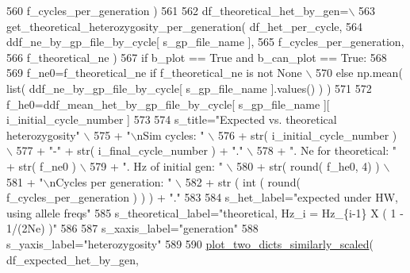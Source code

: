 \begin{DoxyCode}
560                                                                             f\_cycles\_per\_generation )
561 
562         df\_theoretical\_het\_by\_gen=\(\backslash\)
563             get\_theoretical\_heterozygosity\_per\_generation( df\_het\_per\_cycle,
564                                                             ddf\_ne\_by\_gp\_file\_by\_cycle[ s\_gp\_file\_name ],
565                                                             f\_cycles\_per\_generation,
566                                                             f\_theoretical\_ne )
567         \textcolor{keywordflow}{if} b\_plot == \textcolor{keyword}{True} \textcolor{keywordflow}{and} b\_can\_plot == \textcolor{keyword}{True}:
568             
569             f\_ne0=f\_theoretical\_ne \textcolor{keywordflow}{if} f\_theoretical\_ne \textcolor{keywordflow}{is} \textcolor{keywordflow}{not} \textcolor{keywordtype}{None} \(\backslash\)
570                     \textcolor{keywordflow}{else} np.mean(  list( ddf\_ne\_by\_gp\_file\_by\_cycle[ s\_gp\_file\_name ].values() ) )          
571 
572             f\_he0=ddf\_mean\_het\_by\_gp\_file\_by\_cycle[ s\_gp\_file\_name ][ i\_initial\_cycle\_number ]
573 
574             s\_title=\textcolor{stringliteral}{"Expected vs. theoretical heterozygosity"} \(\backslash\)
575                 + \textcolor{stringliteral}{"\(\backslash\)nSim cycles: "} \(\backslash\)
576                 + str( i\_initial\_cycle\_number ) \(\backslash\)
577                 + \textcolor{stringliteral}{"-"} + str( i\_final\_cycle\_number ) + \textcolor{stringliteral}{"."} \(\backslash\)
578                 + \textcolor{stringliteral}{".  Ne for theoretical: "} + str( f\_ne0 ) \(\backslash\)
579                 + \textcolor{stringliteral}{".  Hz of initial gen: "} \(\backslash\)
580                 + str( round( f\_he0, 4) ) \(\backslash\)
581                 + \textcolor{stringliteral}{"\(\backslash\)nCycles per generation: "} \(\backslash\)
582                 + str ( int ( round( f\_cycles\_per\_generation ) ) ) + \textcolor{stringliteral}{"."}
583 
584             s\_het\_label=\textcolor{stringliteral}{"expected under HW, using allele freqs"}
585             s\_theoretical\_label=\textcolor{stringliteral}{"theoretical, Hz\_i = Hz\_\{i-1\} X ( 1 - 1/(2Ne) )"}
586 
587             s\_xaxis\_label=\textcolor{stringliteral}{"generation"}
588             s\_yaxis\_label=\textcolor{stringliteral}{"heterozygosity"}
589             
590             \hyperlink{namespacenegui_1_1pgvalidationtests_afbd41ca3bce1a778d97bd11efe270119}{plot\_two\_dicts\_similarly\_scaled}( df\_expected\_het\_by\_gen, 

\end{DoxyCode}
